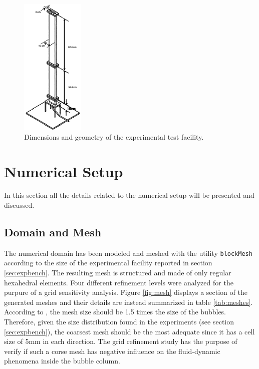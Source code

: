 \documentclass[11pt,a4paper]{article}
\begin{document}
\begin{figure}[!ht]
	\centering
	\includegraphics[width=3cm]{Images/test_facility.png}
	\caption{Dimensions and geometry of the experimental test facility.}
	\label{fig:facility}
\end{figure}


\section{Numerical Setup}
\label{sec:numsetup}
In this section all the details related to the numerical setup will be presented and discussed.




\subsection{Domain and Mesh}
\label{sub:domain}
The numerical domain has been modeled and meshed with the utility \texttt{blockMesh} according to the size of the experimental facility reported in section \ref{sec:expbench}. The resulting mesh is structured and made of only regular hexahedral elements. Four different refinement levels were analyzed for the purpure of a grid sensitivity analysis. Figure \ref{fig:mesh} displays a section of the generated meshes and their details are instead summarized in table \ref{tab:meshes}. According to \cite{krepper}, the mesh size should be 1.5 times the size of the bubbles. Therefore, given the size distribution found in the experiments (see section \ref{sec:expbench}),  the coarsest mesh should be the most adequate since it has a cell size of 5mm in each direction. The grid refinement study has the purpose of verify if such a corse mesh has  negative influence on the fluid-dynamic phenomena inside the bubble column.
 
\end{document}
